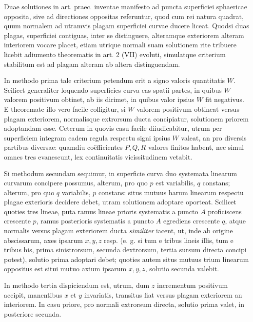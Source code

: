 %
\indent Duae solutiones in art. praec. inventae manifesto ad puncta superficiei sphaericae opposita, sive ad directiones oppositas referuntur, quod cum rei natura quadrat, quum normalem ad utramvis plagam superficiei curvae ducere liceat. Quodsi duas plagas, superficiei contiguas, inter se distinguere, alteramque exteriorem alteram interiorem vocare placet, etiam utrique normali suam solutionem rite tribuere licebit adiumento theorematis in art. 2 (VII) evoluti, simulatque criterium stabilitum est ad plagam alteram ab altera distinguendam.

In methodo prima tale criterium petendum erit a signo valoris quantitatis \(W\). Scilicet generaliter loquendo superficies curva eas spatii partes, in quibus \(W\) valorem positivum obtinet, ab iis dirimet, in quibus valor ipsius \(W\) fit negativus. E theoremate illo vero facile colligitur, si \(W\) valorem positivum obtineat versus plagam exteriorem, normalisque extrorsum ducta concipiatur, solutionem priorem adoptandam esse. Ceterum in quovis casu facile diiudicabitur, utrum per superficiem integram eadem regula respectu signi ipsius \(W\) valeat, an pro diversis partibus diversae: quamdiu coëfficientes \(P,Q,R\) valores finitos habent, nec simul omnes tres evanescunt, lex continuitatis vicissitudinem vetabit.

Si methodum secundam sequimur, in superficie curva duo systemata linearum curvarum concipere possumus, alterum, pro quo \(p\) est variabilis, \(q\) constans; alterum, pro quo \(q\) variabilis, \(p\) constans: situs mutuus harum linearum respectu plagae exterioris decidere debet, utram solutionem adoptare oporteat. Scilicet quoties tres lineae, puta ramus lineae prioris systematis a puncto \(A\) proficiscens crescente \(p\), ramus posterioris systematis a puncto \(A\) egrediens crescente \(q\), atque normalis versus plagam exteriorem ducta \textit{similiter} iacent, ut, inde ab origine abscissarum, axes ipsarum \(x,y,z\) resp. (e. g. si tum e tribus lineis illis, tum e tribus his, prima sinistrorsum, secunda dextrorsum, tertia sursum directa concipi potest), solutio prima adoptari debet; quoties autem situs mutuus trium linearum oppositus est situi mutuo axium ipsarum \(x,y,z\), solutio secunda valebit.

In methodo tertia dispiciendum est, utrum, dum \(z\) incrementum positivum accipit, manentibus \(x\) et \(y\) invariatis, transitus fiat versus plagam exteriorem an interiorem. In casu priore, pro normali extrorsum directa, solutio prima valet, in posteriore secunda.
